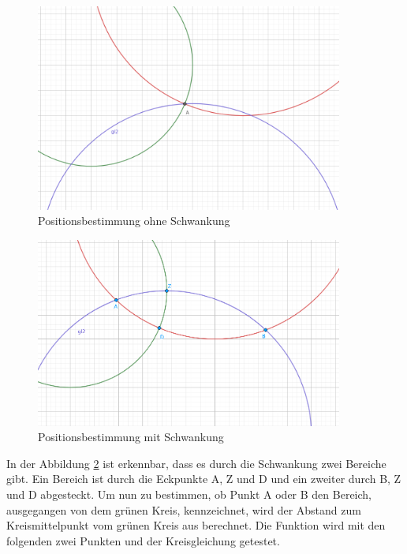 \begin{figure}[H]
\centering
\includegraphics[width=0.9\textwidth]{images/picture_unit_test_calc_position_1.png}
\caption{Positionsbestimmung ohne Schwankung}
\label{img:figure_abstand_zweier_punkte}
\end{figure}

\begin{figure}[H]
\centering
\includegraphics[width=0.9\textwidth]{images/picture_unit_test_calc_position_2.png}
\caption{Positionsbestimmung mit Schwankung}
\label{img:figure_abstand_zweier_punkte}
\end{figure}

In der Abbildung \ref{img:figure_abstand_zweier_punkte} ist erkennbar, dass es durch die Schwankung zwei Bereiche gibt. Ein Bereich ist durch die Eckpunkte \si{A}, \si{Z} und \si{D} und ein zweiter durch \si{B}, \si{Z} und \si{D} abgesteckt. Um nun zu bestimmen, ob Punkt \si{A} oder \si{B} den Bereich, ausgegangen von dem grünen Kreis, kennzeichnet, wird der Abstand zum Kreismittelpunkt vom grünen Kreis aus berechnet. Die Funktion wird mit den folgenden zwei Punkten und der Kreisgleichung getestet.

